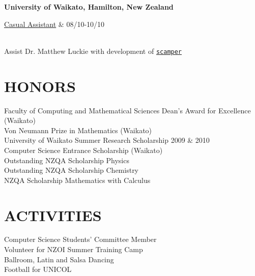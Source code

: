 \documentclass[margin,11pt]{res} %
\begin{document}
\begin{resume}
                {\bf University of Waikato, Hamilton, New Zealand} \\
                \begin{ncolumn}{2} %
                \underline{Casual Assistant} &   08/10-10/10
                \end{ncolumn} \\
                Assist Dr. Matthew Luckie with development of
                \href{http://www.wand.net.nz/scamper}{\tt{scamper}}


\section{HONORS}
				Faculty of Computing and Mathematical Sciences Dean's Award for Excellence (Waikato) \\
				Von Neumann Prize in Mathematics (Waikato) \\
				University of Waikato Summer Research Scholarship 2009 \& 2010 \\
				Computer Science Entrance Scholarship (Waikato) \\
				Outstanding NZQA Scholarship Physics \\
				Outstanding NZQA Scholarship Chemistry \\
				NZQA Scholarship Mathematics with Calculus \\


\section{ACTIVITIES}
				Computer Science Students' Committee Member \\
				Volunteer for NZOI Summer Training Camp \\
				Ballroom, Latin and Salsa Dancing \\
				Football for UNICOL \\


\end{resume}
\end{document}
